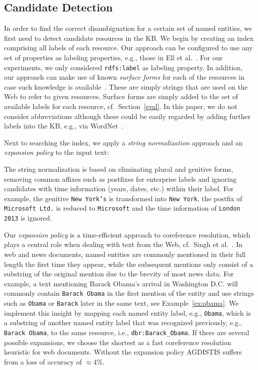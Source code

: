 \subsection{Candidate Detection}\label{choosing}

In order to find the correct disambiguation for a certain set of named entities, we first need to detect candidate resources in the \ac{KB}. 
We begin by creating an index comprising all labels of each resource.
Our approach can be configured to use any set of properties as labeling properties, e.g., those in Ell et al.~\cite{ELL+11}. 
For our experiments, we only considered \texttt{rdfs:label} as labeling property.
In addition, our approach can make use of known \emph{surface forms} for each of the resources in case such knowledge is available~\cite{spotlight}.
These are simply strings that are used on the Web to refer to given resources.
Surface forms are simply added to the set of available labels for each resource, cf.\ Section~\ref{eval}.
In this paper, we do not consider abbreviations although these could be easily regarded by adding further labels into the \ac{KB}, e.g., via WordNet~\cite{wordnet}.

Next to searching the index, we apply a \emph{string normalization} approach and an \emph{expansion policy} to the input text:

The string normalization is based on eliminating plural and genitive forms, removing common affixes such as postfixes for enterprise labels and ignoring candidates with time information (years, dates, etc.) within their label.
For example, the genitive \texttt{New York's} is transformed into \texttt{New York}, the postfix of \texttt{Microsoft Ltd.} is reduced to \texttt{Microsoft} and the time information of \texttt{London 2013} is ignored.

Our \emph{expansion policy} is a time-efficient approach to coreference resolution, which plays a central role when dealing with text from the Web, cf.~Singh et al.~\cite{singh}. 
In web and news documents, named entities are commonly mentioned in their full length the first time they appear, while the subsequent mentions only consist of a substring of the original mention due to the brevity of most news data.
For example, a text mentioning Barack Obama's arrival in Washington D.C. will commonly contain \texttt{Barack Obama} in the first mention of the entity and use strings such as \texttt{Obama} or \texttt{Barack} later in the same text, see Example~\ref{ex:obama}.
We implement this insight by mapping each named entity label, e.g., \texttt{Obama}, which is a substring of another named entity label that was recognized previously, e.g., \texttt{Barack Obama}, to the same resource, i.e., \texttt{dbr:Barack\_Obama}.
If there are several possible expansions, we choose the shortest as a fast coreference resolution heuristic for web documents.
Without the expansion policy AGDISTIS suffers from a loss of accuracy of $\approx4\%$.

